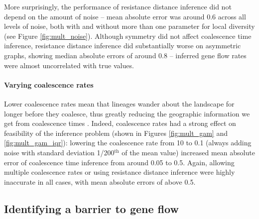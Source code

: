 \documentclass{article}
\begin{document}
More surprisingly, the performance of resistance distance inference 
did not depend on the amount of noise --
mean absolute error was around 0.6 across all levels of noise,
both with and without more than one parameter for local diversity
(see Figure \ref{fig:mult_noise}).
Although symmetry did not affect coalescence time inference,
resistance distance inference did substantially worse on asymmetric graphs,
showing median absolute errors of around 0.8 --
inferred gene flow rates were almost uncorrelated with true values.

\paragraph{Varying coalescence rates}
Lower coalescence rates mean that lineages wander about the landscape for longer
before they coalesce, 
thus greatly reducing the geographic information we get from coalescence times 
\citep{wilkins2004separationoftimescales}.
Indeed, coalescence rates had a strong effect on feasibility of the inference problem
(shown in Figures \ref{fig:mult_gam} and \ref{fig:mult_gam_iqr}):
lowering the coalescence rate from 10 to 0.1
(always adding noise with standard deviation 1/200$^\text{th}$ of the mean value)
increased mean absolute error of coalescence time inference from around 0.05 to 0.5.
Again, allowing multiple coalescence rates
or using resistance distance inference were highly inaccurate in all cases,
with mean absolute errors of above 0.5.


\subsection*{Identifying a barrier to gene flow}
\label{sec:5x3b}
\end{document}

